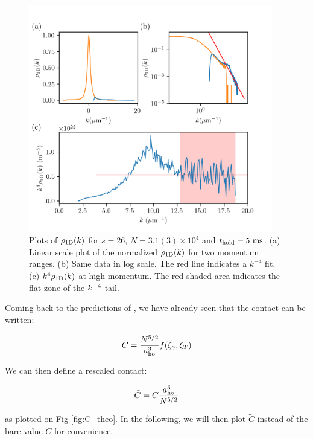 \begin{figure}
    \centering
    \includegraphics[width=0.95\textwidth]{Fig/Chapter5/1D_plots.png}
    \caption[Plots of $\rho_{\rm{1D}}(k)$ for $s=26$, $N=3.1(3) \times 10^4$ and $t_{\rm{hold}}=5 \ \rm{ms}$]{Plots of $\rho_{\rm{1D}}(k)$ for $s=26$, $N=3.1(3) \times 10^4$ and $t_{\rm{hold}}=5 \ \rm{ms}$. (a) Linear scale plot of the normalized $\rho_{\rm{1D}}(k)$ for two momentum ranges. (b) Same data in log scale. The red line indicates a $k^{-4}$ fit. (c) $k^4 \rho_{\rm{1D}} (k)$ at high momentum. The red shaded area indicates the flat zone of the $k^{-4}$ tail.}
    \label{fig:1D_plots}
\end{figure}

Coming back to the predictions of \cite{yao2018tan}, we have already seen that the contact can be written:

\begin{equation}
    C= \frac{N^{5/2}}{a_{\rm{ho}}^3} f(\xi_{\gamma},\xi_{T})
\end{equation}

\noindent We can then define a rescaled contact:

\begin{equation}
    \tilde{C}=C \frac{a_{\rm{ho}}^3}{N^{5/2}}
\end{equation}

\noindent as plotted on Fig-\ref{fig:C_theo}. In the following, we will then plot $\tilde{C}$ instead of the bare value $C$ for convenience.


